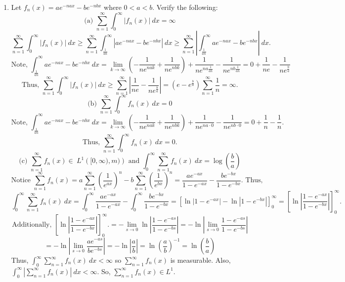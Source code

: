 \begin{enumerate}
\item Let $f_n(x)=ae^{-nax}-be^{-nbx}$ where $0<a<b$. Verify the following: \\
\[
\text{(a) } \sum_{n=1}^\infty \int_0^\infty |f_n(x)|\ dx= \infty 	
\]
\[
\sum_{n=1}^\infty \int_0^\infty |f_n(x)|\ dx \geq \sum_{n=1}^\infty \int_{\frac{1}{an}}^\infty |ae^{-nax}-be^{-nbx}|\ dx \geq \sum_{n=1}^\infty \left|\int_{\frac{1}{an}}^\infty ae^{-nax}-be^{-nbx}\right| \ dx.
\]
\[
\text{Note, } \int_{\frac{1}{an}}^\infty ae^{-nax}-be^{-nbx} \ dx =\lim\limits_{k \rightarrow \infty}\left(-\frac{1}{ne^{nak}}+\frac{1}{ne^{nbk}}\right)+\frac{1}{ne^{na\frac{1}{an}}}-\frac{1}{ne^{nb\frac{1}{an}}}=0+\frac{1}{ne}-\frac{1}{ne^{\frac{b}{a}}}
\]
\[
\text{Thus, } \sum_{n=1}^\infty \int_0^\infty |f_n(x)|\ dx \geq \sum_{n=1}^\infty \left| \frac{1}{ne}-\frac{1}{ne^{\frac{b}{a}}}\right|= \left(e-e^{\frac{b}{a}} \right)\sum_{n=1}^\infty\frac{1}{n}= \infty. 
\]
\[
\text{(b) } \sum_{n=1}^\infty \int_0^\infty f_n(x)\ dx= 0
\]
\[
\text{Note, } \int_{\frac{1}{an}}^\infty ae^{-nax}-be^{-nbx} \ dx =\lim\limits_{k \rightarrow \infty}\left(-\frac{1}{ne^{nak}}+\frac{1}{ne^{nbk}}\right)+\frac{1}{ne^{na\cdot 0}}-\frac{1}{ne^{nb\cdot 0}}=0+\frac{1}{n}-\frac{1}{n}.
\]
\[
\text{Thus, } \sum_{n=1}^\infty \int_0^\infty f_n(x)\ dx= 0.
\]
\[
\text{(c) } \sum_{n=1}^\infty f_n(x) \in \ L^1\left( [0,\infty),m) \right) \text{ and }  \int_0^\infty \sum_{n=1}^\infty f_n(x)\ dx= \log\left(\frac{b}{a}\right)
\]
\[
\text{Notice } \sum_{n=1}^\infty f_n(x) = a\sum_{n=1}^\infty \left(\frac{1}{e^{ax}}\right)^n-b\sum_{n=1}^\infty \left(\frac{1}{e^{bx}}\right)^n= \frac{ae^{-ax}}{1-e^{-ax}} - \frac{be^{-bx}}{1-e^{-bx}}. \text{ Thus,}
\]
\[
\int_0^\infty \sum_{n=1}^\infty f_n(x)\ dx= \int_0^\infty\frac{ae^{-ax}}{1-e^{-ax}} - \int_0^\infty\frac{be^{-bx}}{1-e^{-bx}}=\left[\ln \left|1-e^{-ax}\right|- \ln\left|1-e^{-bx}\right|\right]_{0}^\infty=\left[\ln \left|\frac{1-e^{-ax}}{1-e^{-bx}}\right|\right]_{0}^\infty. 
\]
\[
\text{Additionally, } \left[\ln \left|\frac{1-e^{-ax}}{1-e^{-bx}}\right|\right]_{0}^\infty. = - \lim\limits_{s \rightarrow 0}\ln \left|\frac{1-e^{-as}}{1-e^{-bs}}\right|= -\ln \left| \lim\limits_{s \rightarrow 0} \frac{1-e^{-as}}{1-e^{-bs}}\right|
\]
\[
= -\ln \left| \lim\limits_{s \rightarrow 0} \frac{ae^{-as}}{be^{-bs}}\right|=-\ln\left|\frac{a}{b}\right|= \ln \left(\frac{a}{b} \right)^{-1}= \ln \left( \frac{b}{a}\right)
\]
Thus, $\int_0^\infty \sum_{n=1}^\infty f_n(x)\ dx< \infty$ so $\sum_{n=1}^\infty f_n(x)$ is measurable. Also, $\int_0^\infty \left|\sum_{n=1}^\infty f_n(x)\right|\ dx<\infty$. So, $\sum_{n=1}^\infty f_n(x) \in L^1$.


\end{enumerate}
